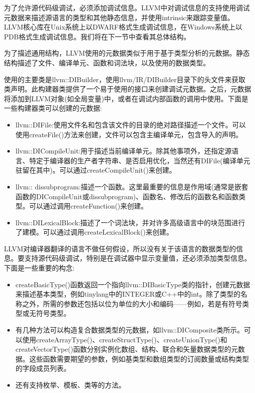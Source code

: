 
为了允许源代码级调试，必须添加调试信息。LLVM中对调试信息的支持使用调试元数据来描述源语言的类型和其他静态信息，并使用intrinsic来跟踪变量值。LLVM核心库在Unix系统上以DWARF格式生成调试信息，在Windows系统上以PDB格式生成调试信息。我们将在下一节中查看其总体结构。


为了描述通用结构，LLVM使用的元数据类似于用于基于类型分析的元数据。静态结构描述了文件、编译单元、函数和词法块，以及使用的数据类型。

使用的主要类是llvm::DIBuilder，使用llvm/IR/DIBuilder目录下的头文件来获取类声明。此构建器类提供了一个易于使用的接口来创建调试元数据。之后，元数据将添加到LLVM对象(如全局变量)中，或者在调试内部函数的调用中使用。下面是一些构建器类可以创建的元数据:

\begin{itemize}
\item
llvm::DIFile:使用文件名和包含该文件的目录的绝对路径描述一个文件。可以使用createFile()方法来创建，文件可以包含主编译单元，包含导入的声明。

\item
llvm::DICompileUnit:用于描述当前编译单元。除其他事项外，还指定源语言、特定于编译器的生产者字符串、是否启用优化，当然还有DIFile(编译单元驻留在其中)。可以通过createCompileUnit()来创建。

\item
llvm:: dissubprogram:描述一个函数。这里最重要的信息是作用域(通常是嵌套函数的DICompileUnit或dissubprogram)、函数名、修改后的函数名和函数类型。可以通过调用createFunction()来创建。

\item
llvm::DILexicalBlock:描述了一个词法块，并对许多高级语言中的块范围进行了建模。可以通过调用createLexicalBlock()来创建。
\end{itemize}

LLVM对编译器翻译的语言不做任何假设，所以没有关于该语言的数据类型的信息。要支持源代码级调试，特别是在调试器中显示变量值，还必须添加类型信息。下面是一些重要的构念:

\begin{itemize}
\item
createBasicType()函数返回一个指向llvm::DIBasicType类的指针，创建元数据来描述基本类型，例如tinylang中的INTEGER或C++中的int。除了类型的名称之外，所需的参数还包括以位为单位的大小和编码——例如，若是有符号类型或无符号类型。

\item
有几种方法可以构造复合数据类型的元数据，如llvm::DIComposite类所示。可以使用createArrayType()、createStructType()、createUnionType()和createVectorType()函数分别实例化数组、结构、联合和矢量数据类型的元数据。这些函数需要期望的参数，例如基类型和数组类型的订阅数量或结构类型的字段成员列表。

\item
还有支持枚举、模板、类等的方法。
\end{itemize}


